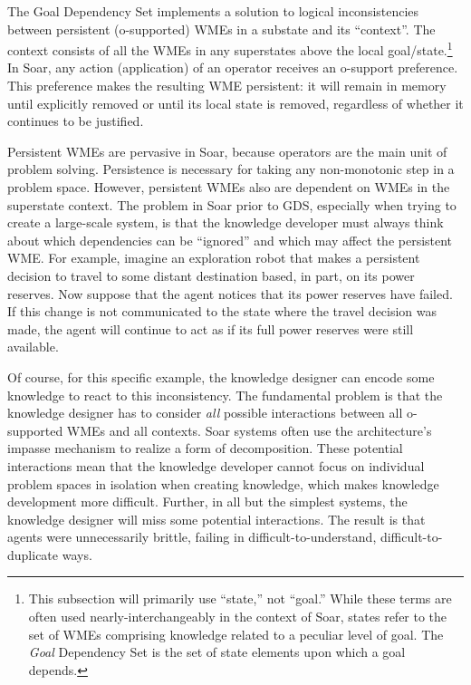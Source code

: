 The Goal Dependency Set implements a solution to logical inconsistencies between persistent (o-supported) WMEs in a substate and its ``context''. The context consists of all the WMEs in any superstates above the local goal/state.\footnote{
	This subsection will primarily use ``state,'' not ``goal.'' While these terms are often used nearly-interchangeably in the context of Soar, states refer to the set of WMEs comprising knowledge related to a peculiar level of goal. The \textit{Goal} Dependency Set is the set of state elements upon which a goal depends.}
In Soar, any action (application) of an operator receives an o-support preference. This preference makes the resulting WME persistent: it will remain in memory until explicitly removed or until its local state is removed, regardless of whether it continues to be justified.

Persistent WMEs are pervasive in Soar, because operators are the main unit of problem solving. Persistence is necessary for taking any non-monotonic step in a problem space. However, persistent WMEs also are dependent on WMEs in the superstate context. The problem in Soar prior to GDS, especially when trying to create a large-scale system\cite{Jones99:Automated}, is that the knowledge developer must always think about which dependencies can be ``ignored'' and which may affect the persistent WME. For example, imagine an exploration robot that makes a persistent decision to travel to some distant destination based, in part, on its power reserves.  Now suppose that the agent notices that its power reserves have failed.  If this change is not communicated to the state where the travel decision was made, the agent will continue to act as if its full power reserves were still available.

Of course, for this specific example, the knowledge designer can encode some knowledge to react to this inconsistency. The fundamental problem is that the knowledge designer has to consider \emph{all} possible interactions between all o-supported WMEs and all contexts. Soar systems often use the architecture's impasse mechanism to realize a form of decomposition. These potential interactions mean that the knowledge developer cannot focus on individual problem spaces in isolation when creating knowledge, which makes knowledge development more difficult. Further, in all but the simplest systems, the knowledge designer will miss some potential interactions. The result is that agents were unnecessarily brittle, failing in difficult-to-understand, difficult-to-duplicate ways.

